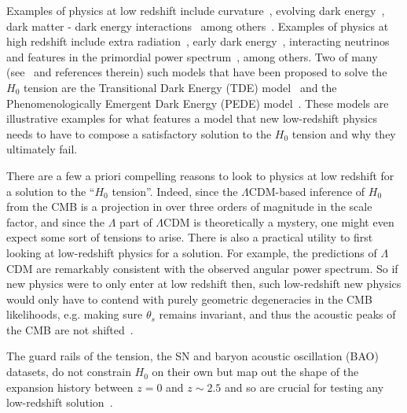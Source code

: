 \documentclass[
 reprint,
 amsmath,amssymb,
 aps,
]{revtex4-2}
\begin{document}
Examples of physics at low redshift include curvature~\cite{Ryan:2019uor,DiValentino:2019qzk}, evolving dark energy~\cite{2018PhRvD..97l3501J,2019JCAP...12..035K,Li:2019yem,2020PhRvD.101j3517B}, dark matter - dark energy interactions~\cite{DiValentino:2020kpf} among others~\cite{DiValentino:2020kha}. Examples of physics at high redshift include extra radiation~\cite{2016JCAP...10..019B}, early dark energy~\cite{Poulin:2018cxd,Sakstein:2019fmf,Hill:2020osr}, interacting neutrinos~\cite{Kreisch:2019yzn,Park:2019ibn} and features in the primordial power spectrum~\cite{Hazra:2018opk,2020JCAP...09..055K,Hazra:2022rdl,Antony:2022ert}, among others. Two of many (see~\cite{Schoneberg:2021qvd,Abdalla:2022yfr} and references therein) such models that have been proposed to solve the $H_0$ tension are the Transitional Dark Energy (TDE) model~\cite{2019JCAP...12..035K} and the Phenomenologically Emergent Dark Energy (PEDE) model~\cite{Li:2019yem}. These models are illustrative examples for what features a model that new low-redshift physics needs to have to compose a satisfactory solution to the $H_0$ tension and why they ultimately fail.

There are a few a priori compelling reasons to look to physics at low redshift for a solution to the ``$H_0$ tension''.  Indeed, since the $\Lambda$CDM-based inference of $H_0$ from the CMB is a projection in over three orders of magnitude in the scale factor, and since the $\Lambda$ part of $\Lambda$CDM is theoretically a mystery, one might even expect some sort of tensions to arise. There is also a practical utility to first looking at low-redshift physics for a solution. For example, 
the predictions of $\Lambda$CDM are remarkably consistent with the observed angular power spectrum.  So if new physics were to only enter at low redshift then, such low-redshift new physics would only have to contend with purely geometric degeneracies in the CMB likelihoods,  e.g. making sure $\theta_s$ remains invariant, and thus the acoustic peaks of the CMB are not shifted~\cite{2018PhRvD..97l3501J,Knox:2019rjx}.

The guard rails of the tension, the SN and baryon acoustic oscillation (BAO) datasets, do not constrain $H_0$ on their own but map out the shape of the expansion history between $z=0$ and $z\sim 2.5$ and so are crucial for testing any low-redshift solution~\cite{Keeley:2020aym}.
\end{document}
